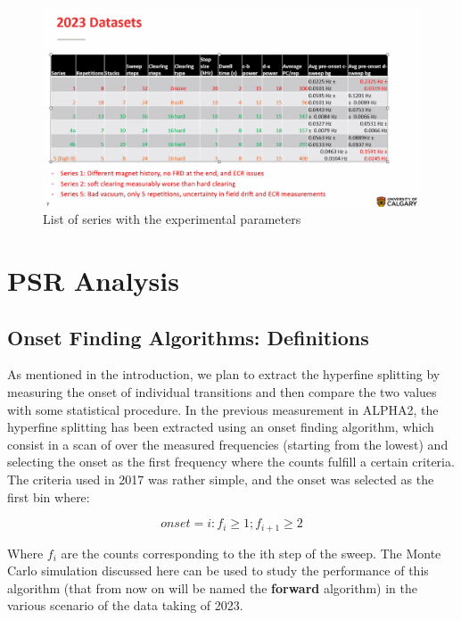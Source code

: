 \documentclass[11pt,a4paper,oneside]{article}
\begin{document}
\begin{figure}[!h]
\centering
\includegraphics[scale = 0.8, angle = 90]{Screenshot 2024-04-02 183852.png}
\caption{List of series with the experimental parameters}
\label{fig:Series}
\end{figure}

\newpage
\section{PSR Analysis}

\subsection{Onset Finding Algorithms: Definitions}

As mentioned in the introduction, we plan to extract the hyperfine splitting by measuring the onset of individual transitions and then compare the two values with some statistical procedure. In the previous measurement in ALPHA2, the hyperfine splitting has been extracted using an onset finding algorithm, which consist in a scan of over the measured frequencies (starting from the lowest) and selecting the onset as the first frequency where the counts fulfill a certain criteria. The criteria used in 2017 was rather simple, and the onset was selected as the first bin where:

\begin{equation}
onset = i : f_i \geq 1; f_{i + 1} \geq 2 
\end{equation}

Where $f_{i}$ are the counts corresponding to the ith step of the sweep. The Monte Carlo simulation discussed here can be used to study the performance of this algorithm (that from now on will be named the \textbf{forward} algorithm) in the various scenario of the data taking of 2023. 
\end{document}

